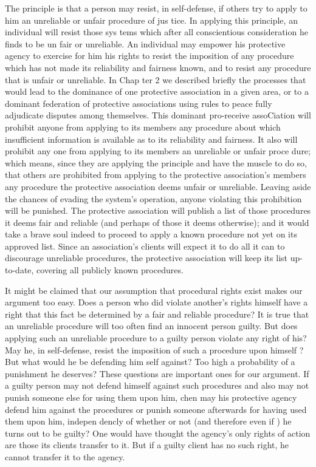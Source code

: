 \documentclass[11pt,openany]{book}
\begin{document}
The principle is that a person may resist, in self-defense, if others try to apply to him an unreliable or unfair procedure of jus tice. In applying this principle, an individual will resist those sys tems which after all conscientious consideration he finds to be un fair or unreliable. An individual may empower his protective agency to exercise for him his rights to resist the imposition of any procedure which has not made its reliability and fairness known, and to resist any procedure that is unfair or unreliable. In Chap ter 2 we described briefly the processes that would lead to the dominance of one protective association in a given area, or to a dominant federation of protective associations using rules to peace fully adjudicate disputes among themselves. This dominant pro-receive assoCiation will prohibit anyone from applying to its members any procedure about which insufficient information is available as to its reliability and fairness. It also will prohibit any one from applying to its members an unreliable or unfair proce dure; which means, since they are applying the principle and have the muscle to do so, that others are prohibited from applying to the protective association's members any procedure the protective association deems unfair or unreliable. Leaving aside the chances of evading the system's operation, anyone violating this prohibition will be punished. The protective association will publish a list of those procedures it deems fair and reliable (and perhaps of those it deems otherwise); and it would take a brave soul indeed to proceed to apply a known procedure not yet on its approved list. Since an association's clients will expect it to do all it can to discourage unreliable procedures, the protective association will keep its list up-to-date, covering all publicly known procedures. 

It might be claimed that our assumption that procedural rights exist makes our argument too easy. Does a person who did violate another's rights himself have a right that this fact be determined by a fair and reliable procedure? It is true that an unreliable procedure will too often find an innocent person guilty. But does applying such an unreliable procedure to a guilty person violate any right of his? May he, in self-defense, resist the imposition of such a procedure upon himself ? But what would he be defending him self against? Too high a probability of a punishment he deserves? These questions are important ones for our argument. If a guilty person may not defend himself against such procedures and also may not punish someone else for using them upon him, chen may his protective agency defend him against the procedures or punish someone afterwards for having used them upon him, indepen dencly of whether or not (and therefore even if ) he turns out to be guilty? One would have thought the agency's only rights of action are those its clients transfer to it. But if a guilty client has no such right, he cannot transfer it to the agency. 
\end{document}
